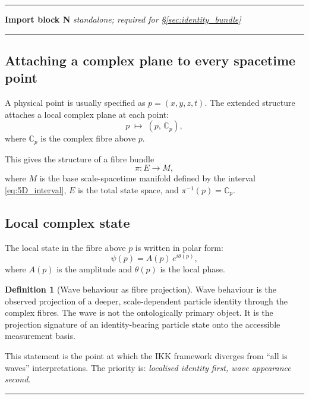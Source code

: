\documentclass[11pt, a4paper, oneside]{article}
\theoremstyle{definition}
\newtheorem{definition}{Definition}[section]
\theoremstyle{plain}
\theoremstyle{remark}
\newcommand{\Cp}{\mathbb{C}_p}
\begin{document}
\noindent\rule{\linewidth}{0.8pt}
\textbf{Import block N} \hfill
  \textit{standalone; required for \S\ref{sec:identity_bundle}}
\noindent\rule{\linewidth}{0.4pt}

\subsection{Attaching a complex plane to every spacetime point}

A physical point is usually specified as
$p = (x, y, z, t)$.
The extended structure attaches a local complex plane at each point:
\begin{equation}
  p \;\mapsto\; (p,\, \Cp),
  \label{eq:fibre_attach}
\end{equation}
where $\Cp$ is the complex fibre above $p$.

This gives the structure of a fibre bundle
\begin{equation}
  \pi : E \to M,
  \label{eq:fibre_bundle}
\end{equation}
where $M$ is the base scale-spacetime manifold defined by the interval
\eqref{eq:5D_interval}, $E$ is the total state space, and $\pi^{-1}(p) = \Cp$.

\subsection{Local complex state}

The local state in the fibre above $p$ is written in polar form:
\begin{equation}
  \psi(p) = A(p)\,e^{i\theta(p)},
  \label{eq:local_state}
\end{equation}
where $A(p)$ is the amplitude and $\theta(p)$ is the local phase.

\begin{definition}[Wave behaviour as fibre projection]
  Wave behaviour is the observed projection of a deeper, scale-dependent
  particle identity through the complex fibres.
  The wave is not the ontologically primary object.
  It is the projection signature of an identity-bearing particle state
  onto the accessible measurement basis.
\end{definition}

\noindent
This statement is the point at which the IKK framework diverges from
``all is waves'' interpretations.
The priority is: \emph{localised identity first, wave appearance second}.

\noindent\rule{\linewidth}{0.4pt}

\end{document}
